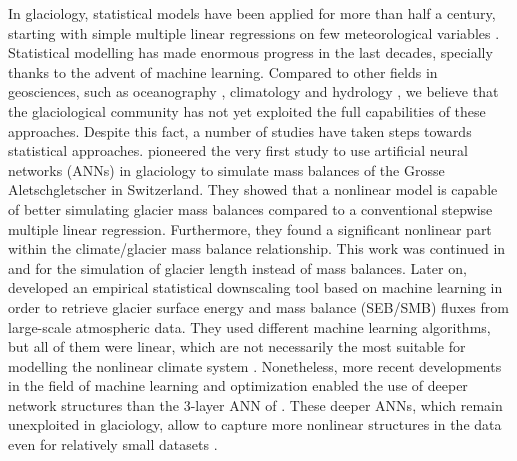 In glaciology, statistical models have been applied for more than half a century, starting with simple multiple linear regressions on few meteorological variables \citep{hoinkes_glacier_1968, martin_correlation_1974}. Statistical modelling has made enormous progress in the last decades, specially thanks to the advent of machine learning. Compared to other fields in geosciences, such as oceanography \citep[e.g.,][]{ducournau_deep_2016, lguensat_eddynet:_2018}, climatology \citep[e.g.,][]{rasp_deep_2018, jiang_deep_2018} and hydrology \citep[e.g.,][]{marcais_prospective_2017, shen_transdisciplinary_2018}, we believe that the glaciological community has not yet exploited the full capabilities of these approaches. Despite this fact, a number of studies have taken steps towards statistical approaches. \citet{steiner_application_2005} pioneered the very first study to use artificial neural networks (ANNs) in glaciology to simulate mass balances of the Grosse Aletschgletscher in Switzerland. They showed that a nonlinear model is capable of better simulating glacier mass balances compared to a conventional stepwise multiple linear regression. Furthermore, they found a significant nonlinear part within the climate/glacier mass balance relationship. This work was continued in \citet{steiner_sensitivity_2008} and \citet{nussbaumer_reseau_2012} for the simulation of glacier length instead of mass balances. Later on, \citet{maussion_enso_2015} developed an empirical statistical downscaling tool based on machine learning in order to retrieve glacier surface energy and mass balance (SEB/SMB) fluxes from large-scale atmospheric data. They used different machine learning algorithms, but all of them were linear, which are not necessarily the most suitable for modelling the nonlinear climate system \citep{houghton_climate_2001}. Nonetheless, more recent developments in the field of machine learning and optimization enabled the use of deeper network structures than the 3-layer ANN of \citet{steiner_application_2005}. These deeper ANNs, which remain unexploited in glaciology, allow to capture more nonlinear structures in the data even for relatively small datasets  \citep{ingrassia_neural_2005, olson_modern_2018}. 

